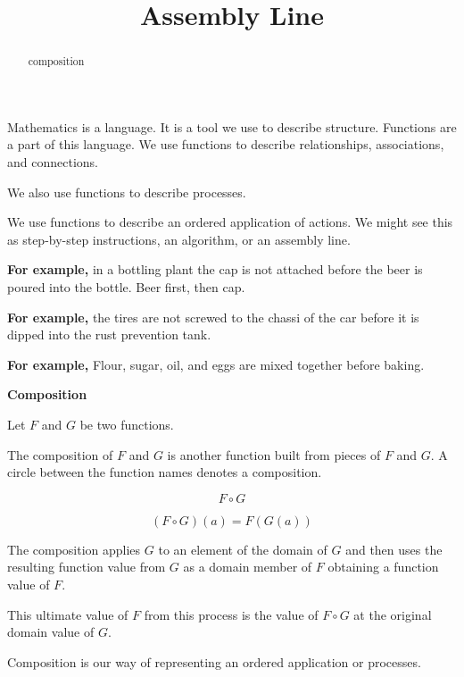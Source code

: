 \documentclass{ximera}
\title{Assembly Line}
\begin{document}
\begin{abstract}
composition
\end{abstract}
\maketitle





Mathematics is a language. It is a tool we use to describe structure. Functions are a part of this language. We use functions to describe relationships, associations, and connections.

We also use functions to describe processes.

We use functions to describe an ordered application of actions. We might see this as step-by-step instructions, an algorithm, or an assembly line.



\textbf{For example,} in a bottling plant the cap is not attached before the beer is poured into the bottle. Beer first, then cap.


\textbf{For example,} the tires are not screwed to the chassi of the car before it is dipped into the rust prevention tank.


\textbf{For example,} Flour, sugar, oil, and eggs are mixed together before baking.





\begin{definition} \textbf{\textcolor{green!50!black}{Composition}}


Let $F$ and $G$ be two functions.

The composition of $F$ and $G$ is another function built from pieces of $F$ and $G$. A circle between the function names denotes a composition.

\[
F \circ G
\]


\[
(F \circ G)(a) = F(G(a))
\]


The composition applies $G$ to an element of the domain of $G$ and then uses the resulting function value from $G$ as a domain member of $F$ obtaining a function value of $F$.

This ultimate value of $F$ from this process is the value of $F \circ G$ at the original domain value of $G$.

\end{definition}



Composition is our way of representing an ordered application or processes.
\end{document}
